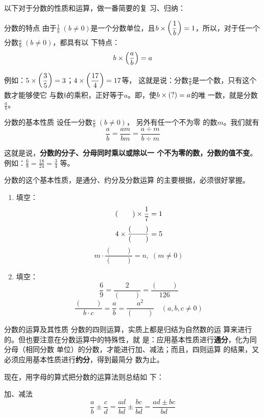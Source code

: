 以下对于分数的性质和运算，做一番简要的复
习、归纳：
\begin{blk}{分数的特点}
    由于$\frac{1}{b}\; (b\ne 0)$是一个分数单位，且$b\times\left(\dfrac{1}{b}\right)=1$，所以，对于任一个分数$\frac{a}{b}\; (b\ne 0)$，都具有以
    下特点：
    \[b\times\left(\dfrac{a}{b}\right)=a \]
\end{blk}

例如：$5\times\left(\dfrac{3}{5}\right)=3$；$4\times\left(\dfrac{17}{4}\right)=17$等，
这就是说：分数$\frac{a}{b}$是一个数，只有这个数才能够使它
与数$b$的乘积，正好等于$a$。即，使$b\times(?)=a$的唯
一数，就是分数$\frac{a}{b}$。

\begin{blk}{分数的基本性质}
    设任一分数$\frac{a}{b}\; (b\ne 0)$，
另外有任一个不为零
的数$m$。我们就有
\[\frac{a}{b}=\frac{am}{bm}=\frac{a\div m}{b\div m} \]
\end{blk}

这就是说，\textbf{分数的分子、分母同时乘以或除以一
个不为零的数，分数的值不变}。例如：$\frac{6}{8}=\frac{18}{24}=\frac{3}{4}$
等。

分数的这个基本性质，是通分、约分及分数运算
的主要根据，必须很好掌握。

\begin{ex}
    \begin{enumerate}
        \item 填空：\[(\qquad )\times \dfrac{1}{7}=1 \]\[4\times\dfrac{(\qquad)}{(\qquad )}=5\]\[m\cdot \frac{(\qquad)}{(\qquad )}=n,\; (m\ne 0)\]
        \item 填空：\[\frac{6}{9}=\frac{2}{(\qquad)}=\frac{(\qquad)}{126}\]\[\frac{(\qquad )}{b\cdot c}=\frac{a}{b}=\frac{a^2}{(\qquad )}\quad (a,b,c\ne 0)\]
    \end{enumerate}
\end{ex}


\begin{blk}{分数的运算及其性质}
    分数的四则运算，实质上都是归结为自然数的运
算来进行的。但也要注意在分数运算中的特殊性，就
是：应用基本性质进行\textbf{通分}，化为同分母（相同分数
单位）的分数，才能进行加、减法；而且，四则运算
的结果，又必须应用基本性质进行\textbf{约分}，得到最简分
数为止。
\end{blk}


现在，用字母的算式把分数的运算法则总结如
下：

\begin{blk}{加、减法}
    \[\frac{a}{b}\pm\frac{c}{d}=\frac{ad}{bd}\pm\frac{bc}{bd}=\frac{ad\pm bc}{bd} \]
\end{blk}

